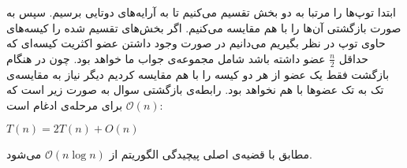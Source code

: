 ابتدا توپ‌ها را مرتبا به دو بخش تقسیم می‌کنیم تا به آرایه‌های دوتایی برسیم. سپس به صورت بازگشتی آن‌ها را با هم مقایسه می‌کنیم. اگر بخش‌های تقسیم شده را کیسه‌های حاوی توپ در نظر بگیریم می‌دانیم در صورت وجود داشتن عضو اکثریت کیسه‌ای که حداقل  $\frac{n}{2}$ عضو داشته باشد شامل مجموعه‌ی جواب ما خواهد بود. چون در هنگام بازگشت فقط یک عضو از هر دو کیسه را با هم مقایسه کردیم دیگر نیاز به مقایسه‌ی تک به تک عضوها با هم نخواهد بود.
رابطه‌ی بازگشتی سوال به صورت زیر است که $\mathcal{O}(n)$ برای مرحله‌ی ادغام است:
\begin{LTR}
$T(n) = 2T(n) + O(n)$ 
\end{LTR}

مطابق با قضیه‌ی اصلی پیچیدگی الگوریتم از $\mathcal{O}(n\log n)$
می‌شود.

